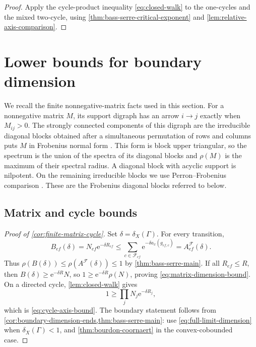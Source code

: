 \documentclass[11pt]{article}
\theoremstyle{definition}
\newcommand{\e}{\mathrm e}
\begin{document}
\begin{proof}
Apply the cycle-product inequality
\eqref{eq:closed-walk} to the one-cycles and the mixed two-cycle, using
\cref{thm:bass-serre-critical-exponent} and \cref{lem:relative-axis-comparison}.
\end{proof}

\section{Lower bounds for boundary dimension}
\label{sec:boundary-lower-bounds}

We recall the finite nonnegative-matrix facts used in this section.  For a nonnegative matrix
$M$, its support digraph has an arrow $i\to j$ exactly when $M_{ij}>0$.  The strongly
connected components of this digraph are the irreducible diagonal blocks obtained after a
simultaneous permutation of rows and columns puts $M$ in Frobenius normal form
\cite[Theorems~3.2.1 and~3.2.4]{BrualdiRyser1991}.  This form is block upper triangular, so
the spectrum is the union of the spectra of its diagonal blocks and $\rho(M)$ is the maximum
of their spectral radius.  A diagonal block with acyclic support is nilpotent. On the remaining
irreducible blocks we use Perron--Frobenius comparison
\cite[Chapter~1]{Seneta2006}.  These are the Frobenius diagonal blocks referred to below.

\subsection{Matrix and cycle bounds}

\begin{proof}[Proof of \cref{cor:finite-matrix-cycle}]
Set $\delta=\delta_X(\Gamma)$.  For every transition,
\[
 B_{ef}(\delta)=N_{ef}\e^{-\delta R_{ef}}
 \le\sum_{c\in\mathcal F_{ef}}\e^{-\delta a_x(g_{ef,c})}
 =A^{\mathcal F}_{ef}(\delta).
\]
Thus
$\rho(B(\delta))\le\rho(A^{\mathcal F}(\delta))\le1$ by
\cref{thm:bass-serre-main}.  If all $R_{ef}\le R$, then
$B(\delta)\ge\e^{-\delta R}N$, so
$1\ge\e^{-\delta R}\rho(N)$, proving
\eqref{eq:matrix-dimension-bound}.  On a directed cycle,
\cref{lem:closed-walk} gives
\[
 1\ge\prod_jN_j\e^{-\delta R_j},
\]
which is \eqref{eq:cycle-axis-bound}.  The boundary statement follows from \cref{cor:boundary-dimension-ends,thm:bass-serre-main}: use \eqref{eq:full-limit-dimension}
when $\delta_X(\Gamma)<1$, and \cref{thm:bourdon-coornaert} in the convex-cobounded case.
\end{proof}
\end{document}
